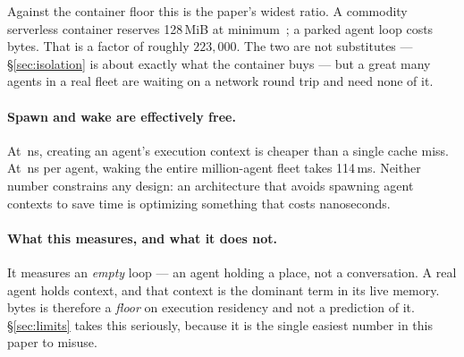 Against the container floor this is the paper's widest ratio. A commodity
serverless container reserves 128\,MiB at minimum~\cite{modal}; a parked agent
loop costs \rGoPer{}\,bytes. That is a factor of roughly $223{,}000$. The two
are not substitutes --- \S\ref{sec:isolation} is about exactly what the container
buys --- but a great many agents in a real fleet are waiting on a network round
trip and need none of it.

\paragraph{Spawn and wake are effectively free.}
At \rGoSpawn{}\,ns, creating an agent's execution context is cheaper than a
single cache miss. At \rGoWake{}\,ns per agent, waking the entire million-agent
fleet takes 114\,ms. Neither number constrains any design: an architecture that
avoids spawning agent contexts to save time is optimizing something that costs
nanoseconds.

\paragraph{What this measures, and what it does not.}
It measures an \emph{empty} loop --- an agent holding a place, not a
conversation. A real agent holds context, and that context is the dominant term
in its live memory. \rGoPer{}\,bytes is therefore a \emph{floor} on execution
residency and not a prediction of it. \S\ref{sec:limits} takes this seriously,
because it is the single easiest number in this paper to misuse.
